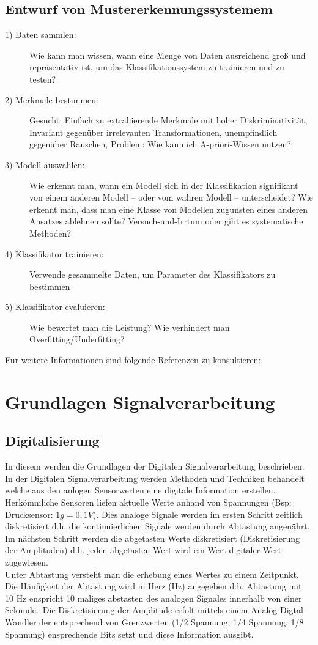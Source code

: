 \documentclass{article} %
\theoremstyle{definition}
\begin{document}
	\subsection{Entwurf von Mustererkennungssystemem}
	\begin{description}
		\item[1) Daten sammlen:] Wie kann man wissen, wann eine Menge von Daten ausreichend groß und repräsentativ ist, um das Klassifikationssystem zu trainieren und zu testen? 
		\item[2) Merkmale bestimmen:] Gesucht: Einfach zu extrahierende Merkmale mit hoher Diskriminativität, Invariant gegenüber irrelevanten Transformationen, unempfindlich gegenüber Rauschen, Problem: Wie kann ich A-priori-Wissen nutzen?
		\item[3) Modell auswählen:] Wie erkennt man, wann ein Modell sich in der Klassifikation signifikant von einem anderen Modell – oder vom wahren Modell – unterscheidet? Wie erkennt man, dass man eine Klasse von Modellen zugunsten eines anderen Ansatzes ablehnen sollte? Versuch-und-Irrtum oder gibt es systematische Methoden?
		\item[4) Klassifikator trainieren:] Verwende gesammelte Daten, um Parameter des Klassifikators zu bestimmen
		\item[5) Klassifikator evaluieren:] Wie bewertet man die Leistung? Wie verhindert man Overfitting/Underfitting?
	\end{description}
	Für weitere Informationen sind folgende Referenzen zu konsultieren: \cite[S. 3-16]{dudaPattern}
\section{Grundlagen Signalverarbeitung}
	\subsection{Digitalisierung}
		In diesem werden die Grundlagen der Digitalen Signalverarbeitung beschrieben. In der Digitalen Signalverarbeitung werden Methoden und Techniken behandelt welche aus den anlogen Sensorwerten eine digitale Information erstellen.\\
		Herkömmliche Sensoren liefen aktuelle Werte anhand von Spannungen (Bsp: Drucksensor: $1g = 0,1V$). Dies analoge Signale werden im ersten Schritt zeitlich diskretisiert d.h. die kontinuierlichen Signale werden durch Abtastung angenährt. Im nächsten Schritt werden die abgetasten Werte diskretisiert (Diskretisierung der Amplituden) d.h. jeden abgetasten Wert wird ein Wert digitaler Wert zugewiesen.\\
		Unter Abtastung versteht man die erhebung eines Wertes zu einem Zeitpunkt. Die Häufigkeit der Abtastung wird in Herz (Hz) angegeben d.h. Abtastung mit 10 Hz enspricht 10 maliges abstasten des analogen Signales innerhalb von einer Sekunde.\
		Die Diskretisierung der Amplitude erfolt mittels einem Analog-Digtal-Wandler der entsprechend von Grenzwerten (1/2 Spannung, 1/4 Spannung, 1/8 Spannung) ensprechende Bits setzt und diese Information ausgibt.
\end{document}
